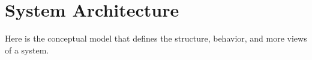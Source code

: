 
\section{System Architecture}

Here is the conceptual model that defines the structure, behavior, and more views of a system.



